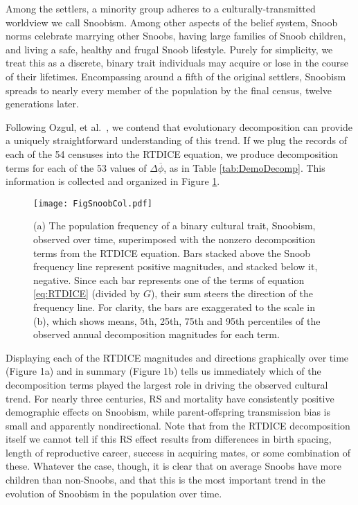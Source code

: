 \documentclass[11pt]{article}
\begin{document}
Among the settlers, a minority group adheres to a culturally-transmitted worldview we call Snoobism.  Among other aspects of the belief system, Snoob norms celebrate marrying other Snoobs, having large families of Snoob children, and living a safe, healthy and frugal Snoob lifestyle.  Purely for simplicity, we treat this as a discrete, binary trait individuals may acquire or lose in the course of their lifetimes.  Encompassing around a fifth of the original settlers, Snoobism spreads to nearly every member of the population by the final census, twelve generations later.  

Following Ozgul, et al.~\citeyearpar{ozgul2009dynamics}, we contend that evolutionary decomposition can provide a uniquely straightforward understanding of this trend.  If we plug the records of each of the 54 censuses into the RTDICE equation, we produce decomposition terms for each of the 53 values of $\Delta \overline{\phi}$, as in Table \ref{tab:DemoDecomp}.  This information is collected and organized in Figure \ref{fig:Snoob}.

\begin{figure}[t]
\begin{center} 
\texttt{[image: FigSnoobCol.pdf]}
\caption{(a) The population frequency of a binary cultural trait, Snoobism, observed over time, superimposed with the nonzero decomposition terms from the RTDICE equation.  Bars stacked above the Snoob frequency line represent positive magnitudes, and stacked below it, negative.  Since each bar represents one of the terms of equation \ref{eq:RTDICE} (divided by $G$), their sum steers the direction of the frequency line.  For clarity, the bars are exaggerated to the scale in (b), which shows means, 5th, 25th, 75th and 95th percentiles of the observed annual decomposition magnitudes for each term.}
\label{fig:Snoob}
\end{center}
\end{figure}

Displaying each of the RTDICE magnitudes and directions graphically over time (Figure 1a) and in summary (Figure 1b) tells us immediately which of the decomposition terms played the largest role in driving the observed cultural trend.  For nearly three centuries, RS and mortality have consistently positive demographic effects on Snoobism, while parent-offspring transmission bias is small and apparently nondirectional.  Note that from the RTDICE decomposition itself we cannot tell if this RS effect results from differences in birth spacing, length of reproductive career, success in acquiring mates, or some combination of these.  Whatever the case, though, it is clear that on average Snoobs have more children than non-Snoobs, and that this is the most important trend in the evolution of Snoobism in the population over time.  
\end{document}
